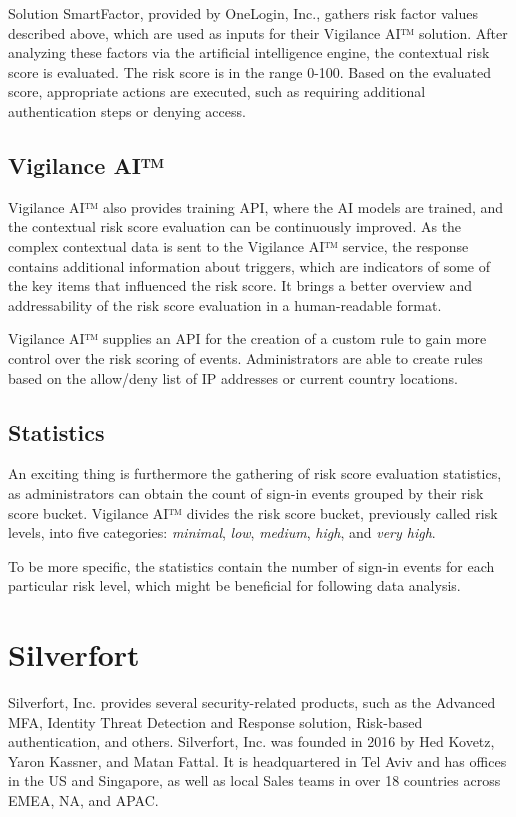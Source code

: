 Solution SmartFactor, provided by OneLogin, Inc., gathers risk factor values described above, which are used as inputs for their Vigilance AI™ solution.
After analyzing these factors via the artificial intelligence engine, the contextual risk score is evaluated.
The risk score is in the range 0-100.
Based on the evaluated score, appropriate actions are executed, such as requiring additional authentication steps or denying access.\cite{existing-onelogin} 

\subsection*{Vigilance AI™}

Vigilance AI™ also provides training API, where the AI models are trained, and the contextual risk score evaluation can be continuously improved.
As the complex contextual data is sent to the Vigilance AI™ service, the response contains additional information about triggers, which are indicators of some of the key items that influenced the risk score.
It brings a better overview and addressability of the risk score evaluation in a human-readable format.

Vigilance AI™ supplies an API for the creation of a custom rule to gain more control over the risk scoring of events.
Administrators are able to create rules based on the allow/deny list of IP addresses or current country locations. \cite{existing-onelogin-vigilance}

\newpage
\subsection*{Statistics}

An exciting thing is furthermore the gathering of risk score evaluation statistics, as administrators can obtain the count of sign-in events grouped by their risk score bucket.
Vigilance AI™ divides the risk score bucket, previously called risk levels, into five categories: \textit{minimal}, \textit{low}, \textit{medium}, \textit{high}, and \textit{very high}.

To be more specific, the statistics contain the number of sign-in events for each particular risk level, which might be beneficial for following data analysis. \cite{existing-onelogin-score-insights} \cite{existing-onelogin-score}

\newpage
\section{Silverfort}
Silverfort, Inc. provides several security-related products, such as the Advanced MFA, Identity Threat Detection and Response solution, Risk-based authentication, and others.
Silverfort, Inc. was founded in 2016 by Hed Kovetz, Yaron Kassner, and Matan Fattal.
It is headquartered in Tel Aviv and has offices in the US and Singapore, as well as local Sales teams in over 18 countries across EMEA, NA, and APAC.\cite{example_silverfort}

